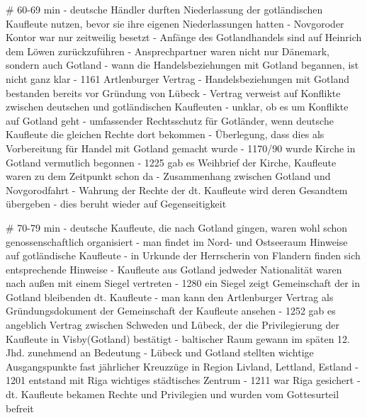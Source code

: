 \documentclass[10pt,a4paper,oneside,ngerman,numbers=noenddot]{scrartcl}
\begin{document}
# 60-69 min
- deutsche Händler durften Niederlassung der gotländischen Kaufleute nutzen, bevor sie ihre eigenen Niederlassungen hatten
- Novgoroder Kontor war nur zeitweilig besetzt
- Anfänge des Gotlandhandels sind auf Heinrich dem Löwen zurückzuführen
- Ansprechpartner waren nicht nur Dänemark, sondern auch Gotland
- wann die Handelsbeziehungen mit Gotland begannen, ist nicht ganz klar
- 1161 Artlenburger Vertrag
- Handelsbeziehungen mit Gotland bestanden bereits vor Gründung von Lübeck
- Vertrag verweist auf Konflikte zwischen deutschen und gotländischen Kaufleuten
- unklar, ob es um Konflikte auf Gotland geht
- umfassender Rechtsschutz für Gotländer, wenn deutsche Kaufleute die gleichen Rechte dort bekommen
- Überlegung, dass dies als Vorbereitung für Handel mit Gotland gemacht wurde
- 1170/90 wurde Kirche in Gotland vermutlich begonnen
- 1225 gab es Weihbrief der Kirche, Kaufleute waren zu dem Zeitpunkt schon da
- Zusammenhang zwischen Gotland und Novgorodfahrt
- Wahrung der Rechte der dt. Kaufleute wird deren Gesandtem übergeben
- dies beruht wieder auf Gegenseitigkeit

# 70-79 min
- deutsche Kaufleute, die nach Gotland gingen, waren wohl schon genossenschaftlich organisiert
- man findet im Nord- und Ostseeraum Hinweise auf gotländische Kaufleute
- in Urkunde der Herrscherin von Flandern finden sich entsprechende Hinweise
- Kaufleute aus Gotland jedweder Nationalität waren nach außen mit einem Siegel vertreten
- 1280 ein Siegel zeigt Gemeinschaft der in Gotland bleibenden dt. Kaufleute
- man kann den Artlenburger Vertrag als Gründungsdokument der Gemeinschaft der Kaufleute ansehen
- 1252 gab es angeblich Vertrag zwischen Schweden und Lübeck, der die Privilegierung der Kaufleute
  in Visby(Gotland) bestätigt
- baltischer Raum gewann im späten 12. Jhd. zunehmend an Bedeutung
- Lübeck und Gotland stellten wichtige Ausgangspunkte fast jährlicher Kreuzzüge in Region Livland, Lettland, Estland
- 1201 entstand mit Riga wichtiges städtisches Zentrum
- 1211 war Riga gesichert
- dt. Kaufleute bekamen Rechte und Privilegien und wurden vom Gottesurteil befreit
\end{document}
